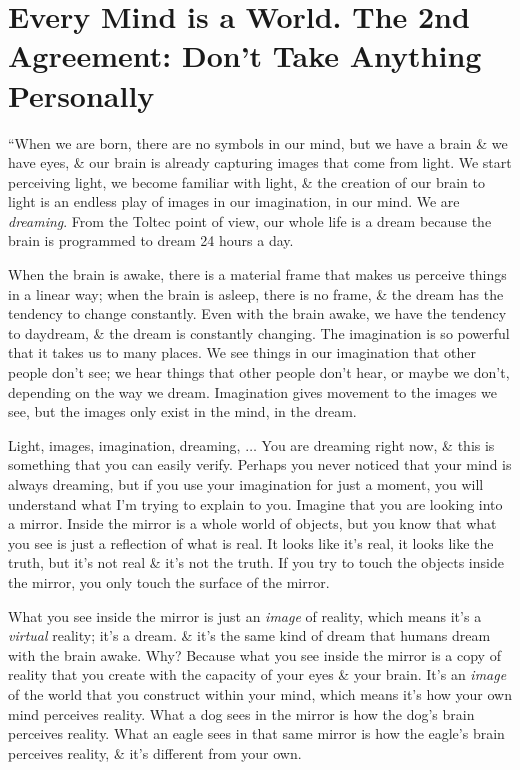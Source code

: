 \documentclass{article}
\numberwithin{equation}{section}
\begin{document}

\section{Every Mind is a World. The 2nd Agreement: Don't Take Anything Personally}
``When we are born, there are no symbols in our mind, but we have a brain \& we have eyes, \& our brain is already capturing images that come from light. We start perceiving light, we become familiar with light, \& the creation of our brain to light is an endless play of images in our imagination, in our mind. We are \textit{dreaming}. From the Toltec point of view, our whole life is a dream because the brain is programmed to dream 24 hours a day.

When the brain is awake, there is a material frame that makes us perceive things in a linear way; when the brain is asleep, there is no frame, \& the dream has the tendency to change constantly. Even with the brain awake, we have the tendency to daydream, \& the dream is constantly changing. The imagination is so powerful that it takes us to many places. We see things in our imagination that other people don't see; we hear things that other people don't hear, or maybe we don't, depending on the way we dream. Imagination gives movement to the images we see, but the images only exist in the mind, in the dream.

Light, images, imagination, dreaming, $\ldots$ You are dreaming right now, \& this is something that you can easily verify. Perhaps you never noticed that your mind is always dreaming, but if you use your imagination for just a moment, you will understand what I'm trying to explain to you. Imagine that you are looking into a mirror. Inside the mirror is a whole world of objects, but you know that what you see is just a reflection of what is real. It looks like it's real, it looks like the truth, but it's not real \& it's not the truth. If you try to touch the objects inside the mirror, you only touch the surface of the mirror.

What you see inside the mirror is just an \textit{image} of reality, which means it's a \textit{virtual} reality; it's a dream. \& it's the same kind of dream that humans dream with the brain awake. Why? Because what you see inside the mirror is a copy of reality that you create with the capacity of your eyes \& your brain. It's an \textit{image} of the world that you construct within your mind, which means it's how your own mind perceives reality. What a dog sees in the mirror is how the dog's brain perceives reality. What an eagle sees in that same mirror is how the eagle's brain perceives reality, \& it's different from your own.
\end{document}
